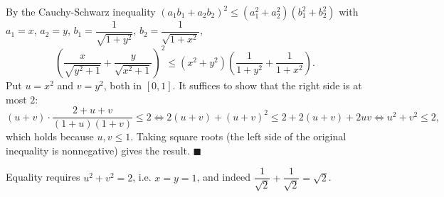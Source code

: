 By the Cauchy-Schwarz inequality $\left(a_1b_1+a_2b_2\right)^2\le\left(a_1^2+a_2^2\right)\left(b_1^2+b_2^2\right)$ with $a_1=x$, $a_2=y$, $b_1=\dfrac1{\sqrt{1+y^2}}$, $b_2=\dfrac1{\sqrt{1+x^2}}$,
\[\left(\dfrac{x}{\sqrt{y^2+1}}+\dfrac{y}{\sqrt{x^2+1}}\right)^2\le\left(x^2+y^2\right)\left(\dfrac1{1+y^2}+\dfrac1{1+x^2}\right).\]
Put $u=x^2$ and $v=y^2$, both in $[0,1]$. It suffices to show that the right side is at most $2$:
\[(u+v)\cdot\dfrac{2+u+v}{(1+u)(1+v)}\le2\iff2(u+v)+(u+v)^2\le2+2(u+v)+2uv\iff u^2+v^2\le2,\]
which holds because $u,v\le1$. Taking square roots (the left side of the original inequality is nonnegative) gives the result. $\blacksquare$

Equality requires $u^2+v^2=2$, i.e. $x=y=1$, and indeed $\dfrac{1}{\sqrt2}+\dfrac1{\sqrt2}=\sqrt2$.
